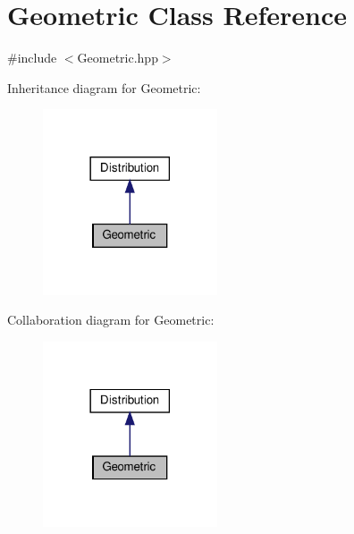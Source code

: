 \hypertarget{classGeometric}{}\section{Geometric Class Reference}
\label{classGeometric}


{\ttfamily \#include $<$Geometric.\+hpp$>$}



Inheritance diagram for Geometric\+:
\nopagebreak
\begin{figure}[H]
\begin{center}
\leavevmode
\includegraphics[width=146pt]{classGeometric__inherit__graph}
\end{center}
\end{figure}


Collaboration diagram for Geometric\+:
\nopagebreak
\begin{figure}[H]
\begin{center}
\leavevmode
\includegraphics[width=146pt]{classGeometric__coll__graph}
\end{center}
\end{figure}
